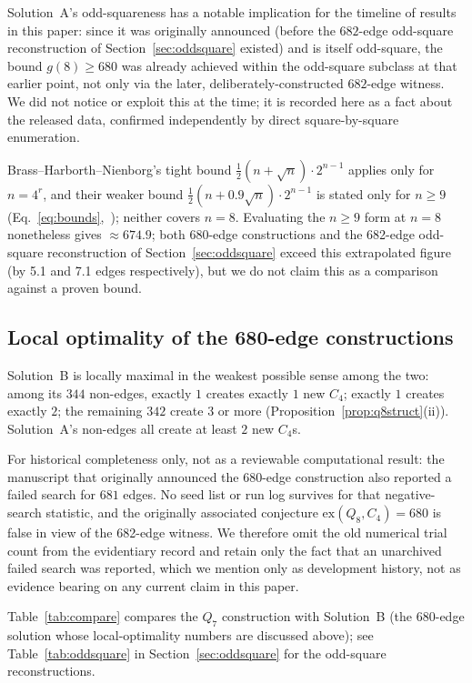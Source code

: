\documentclass[12pt]{article}
\newcommand{\ex}{\mathrm{ex}}
\begin{document}
Solution~A's odd-squareness has a notable implication for the timeline
of results in this paper: since it was originally announced (before
the $682$-edge odd-square reconstruction of
Section~\ref{sec:oddsquare} existed) and is itself odd-square, the
bound $g(8)\ge680$ was already achieved within the odd-square subclass
at that earlier point, not only via the later, deliberately-constructed
$682$-edge witness. We did not notice or exploit this at the time; it
is recorded here as a fact about the released data, confirmed
independently by direct square-by-square enumeration.

\begin{remark}
Brass--Harborth--Nienborg's tight bound $\tfrac12(n+\sqrt n)\cdot2^{n-1}$
applies only for $n=4^r$, and their weaker bound
$\tfrac12(n+0.9\sqrt n)\cdot2^{n-1}$ is stated only for $n\ge9$
(Eq.~\eqref{eq:bounds},~\cite{BHN95}); neither covers $n=8$. Evaluating
the $n\ge9$ form at $n=8$ nonetheless gives $\approx674.9$; both
680-edge constructions and the 682-edge odd-square reconstruction of
Section~\ref{sec:oddsquare} exceed this extrapolated figure (by 5.1 and
7.1 edges respectively), but we do not claim this as a comparison
against a proven bound.
\end{remark}

\subsection{Local optimality of the 680-edge constructions}

Solution~B is locally maximal in the weakest possible sense among the
two: among its $344$ non-edges, exactly $1$ creates exactly $1$ new
$C_4$; exactly $1$ creates exactly $2$; the remaining $342$ create $3$
or more (Proposition~\ref{prop:q8struct}(ii)). Solution~A's non-edges
all create at least $2$ new $C_4$s.

For historical completeness only, not as a reviewable computational
result: the manuscript that originally announced the $680$-edge
construction also reported a failed search for $681$ edges. No seed list or
run log survives for that negative-search statistic, and the originally
associated conjecture $\ex(Q_8,C_4)=680$ is false in view of the 682-edge
witness. We therefore omit the old numerical trial count from the evidentiary
record and retain only the fact that an unarchived failed search was reported,
which we mention only as
development history, not as evidence bearing on any current claim in
this paper.

Table~\ref{tab:compare} compares the $Q_7$ construction with Solution~B
(the 680-edge solution whose local-optimality numbers are discussed
above); see Table~\ref{tab:oddsquare} in Section~\ref{sec:oddsquare} for
the odd-square reconstructions.
\end{document}

